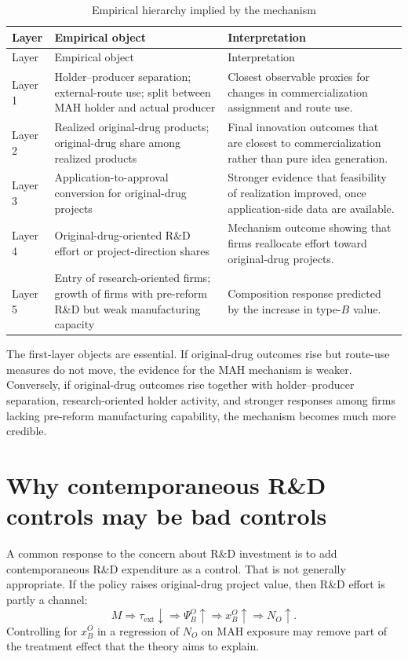 \documentclass[12pt]{article}
\newcommand{\tauext}{\tau_{\mathrm{ext}}}
\begin{document}
\begin{longtable}{p{}p{}p{}}
\caption{Empirical hierarchy implied by the mechanism}\label{tab:hierarchy}\\
\toprule
Layer & Empirical object & Interpretation \\
\midrule
\endfirsthead
\toprule
Layer & Empirical object & Interpretation \\
\midrule
\endhead
Layer 1 & Holder--producer separation; external-route use; split between MAH holder and actual producer & Closest observable proxies for changes in commercialization assignment and route use. \\
\addlinespace
Layer 2 & Realized original-drug products; original-drug share among realized products & Final innovation outcomes that are closest to commercialization rather than pure idea generation. \\
\addlinespace
Layer 3 & Application-to-approval conversion for original-drug projects & Stronger evidence that feasibility of realization improved, once application-side data are available. \\
\addlinespace
Layer 4 & Original-drug-oriented R\&D effort or project-direction shares & Mechanism outcome showing that firms reallocate effort toward original-drug projects. \\
\addlinespace
Layer 5 & Entry of research-oriented firms; growth of firms with pre-reform R\&D but weak manufacturing capacity & Composition response predicted by the increase in type-$B$ value. \\
\bottomrule
\end{longtable}

The first-layer objects are essential. If original-drug outcomes rise but route-use measures do not move, the evidence for the MAH mechanism is weaker. Conversely, if original-drug outcomes rise together with holder--producer separation, research-oriented holder activity, and stronger responses among firms lacking pre-reform manufacturing capability, the mechanism becomes much more credible.

\section{Why contemporaneous R\&D controls may be bad controls}

A common response to the concern about R\&D investment is to add contemporaneous R\&D expenditure as a control. That is not generally appropriate. If the policy raises original-drug project value, then R\&D effort is partly a channel:
\[
M \Rightarrow \tauext\downarrow \Rightarrow \Psi_B^O\uparrow \Rightarrow x_B^O\uparrow \Rightarrow N_O\uparrow.
\]
Controlling for $x_B^O$ in a regression of $N_O$ on MAH exposure may remove part of the treatment effect that the theory aims to explain.
\end{document}
